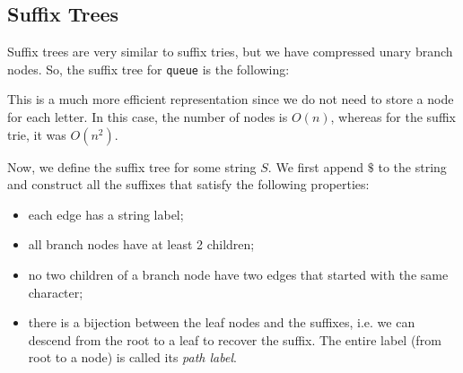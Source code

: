 \documentclass[a4paper, openany]{memoir}
\begin{document}
    \subsection{Suffix Trees}
    Suffix trees are very similar to suffix tries, but we have compressed unary branch nodes. So, the suffix tree for \texttt{queue} is the following:
    \begin{figure}[H]
        \centering
    \end{figure}    
    \noindent This is a much more efficient representation since we do not need to store a node for each letter. In this case, the number of nodes is $O(n)$, whereas for the suffix trie, it was $O(n^2)$.

    Now, we define the suffix tree for some string $S$. We first append $\$$ to the string and construct all the suffixes that satisfy the following properties:
    \begin{itemize}
        \item each edge has a string label;
        \item all branch nodes have at least 2 children;
        \item no two children of a branch node have two edges that started with the same character;
        \item there is a bijection between the leaf nodes and the suffixes, i.e. we can descend from the root to a leaf to recover the suffix. The entire label (from root to a node) is called its \emph{path label}.
    \end{itemize}
\end{document}
